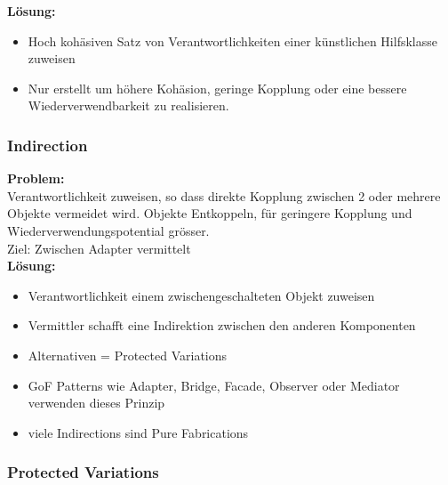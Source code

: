\documentclass[../ZF_SWEN1.tex]{subfiles}
\begin{document}
\textbf{Lösung:\\}
\begin{itemize}
	\item Hoch kohäsiven Satz von Verantwortlichkeiten einer künstlichen Hilfsklasse zuweisen
	\item Nur erstellt um höhere Kohäsion, geringe Kopplung oder eine bessere Wiederverwendbarkeit zu realisieren.
\end{itemize}



\subsubsection{Indirection}
\textbf{Problem:\\}
Verantwortlichkeit zuweisen, so dass direkte Kopplung zwischen 2 oder mehrere Objekte vermeidet wird. Objekte Entkoppeln, für geringere Kopplung und Wiederverwendungspotential grösser.\\
Ziel: Zwischen Adapter vermittelt\\
\textbf{Lösung:\\}
\begin{itemize}
	\item Verantwortlichkeit einem zwischengeschalteten Objekt zuweisen
	\item Vermittler schafft eine Indirektion zwischen den anderen Komponenten
	\item Alternativen = Protected Variations
	\item GoF Patterns wie Adapter, Bridge, Facade, Observer oder Mediator verwenden dieses Prinzip
	\item viele Indirections sind Pure Fabrications
\end{itemize}

\subsubsection{Protected Variations}
\end{document}
